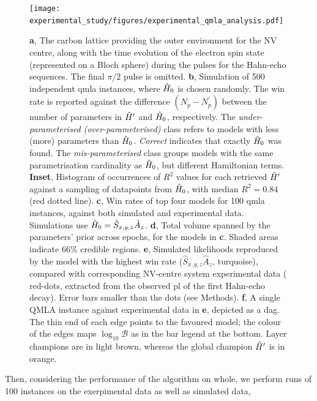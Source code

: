 \begin{figure}
    \texttt{[image: experimental\_study/figures/experimental\_qmla\_analysis.pdf]}
    \caption[\gls{qmla} applied to experimental system.]{
        \textbf{a}, 
        The carbon lattice providing the outer environment for the NV centre, along with the
        time evolution of the electron spin state (represented on a Bloch sphere) during the pulses for the Hahn-echo sequences. The final $\pi/2$ pulse is omitted.  
        \textbf{b}, 
        Simulation of 500 independent \gls{qmla} instances, where $\hat{H}_0$ is chosen randomly. 
        The win rate is reported against the difference $(N_{p}-N^{\prime}_p)$ between the 
        number of parameters in $\hat{H}^{\prime}$ and $\hat{H}_0$, respectively. 
        The \emph{under-parameterised} \emph{ (over-parameterised)} class refers to models with less (more) 
        parameters than $\hat{H}_0$. 
        \emph{Correct} indicates that exactly $\hat{H}_0$ was found. 
        The \emph{mis-parameterised} class groups models with the same parametrisation cardinality as $\hat{H}_0$, but different Hamiltonian terms. 
        \textbf{Inset}, Histogram of occurrences of $R^2$ values for each retrieved $\hat{H}^{\prime}$ 
        against a sampling of datapoints from $\hat{H}_0$, with median $R^2=0.84$ (red dotted line). 
        \textbf{c}, 
        Win rates of top four models for 100 \gls{qmla} instances, 
        against both simulated and experimental data. 
        Simulations use $\hat{H}_0 = \hat{S}_{x,y,z}\hat{A}_{z}$.
        \textbf{d}, 
        Total volume spanned by the parameters' prior across epochs, for the models in \textbf{c}. 
        Shaded areas indicate $66\%$ credible regions. 
        \textbf{e}, 
        Simulated likelihoods reproduced by the model with the highest win rate ($\hat{S}_{x,y,z}\hat{A}_{z}$, turquoise), 
            compared with corresponding NV-centre system experimental data (
                red-dots, extracted from the observed \gls{pl} of the first Hahn-echo decay). 
        Error bars smaller than the dots (see Methods).
        \textbf{f}, 
        A single QMLA instance against experimental data in \textbf{e}, depicted as a \gls{dag}.
        The thin end of each edge points to the favoured model; 
        the colour of the edges maps $\log_{10}\mathcal{B}$ as in the bar legend at the bottom. 
        Layer champions \huc are in light brown, whereas the global champion $\hat{H}^{\prime}$  is in orange.    
    }
    \label{fig:exp_qmla_analysis}
\end{figure}
Then, considering the performance of the algorithm on whole, 
    we perform \glspl{run} of 100 instances on the exerpimental data as well as simulated data,
